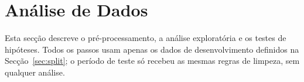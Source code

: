 \section{Análise de Dados}
\label{sec:analise}

Esta secção descreve o pré-processamento, a análise exploratória e os testes de hipóteses. Todos os passos usam apenas os dados de desenvolvimento definidos na Secção~\ref{sec:split}; o período de teste só recebeu as mesmas regras de limpeza, sem qualquer análise.




